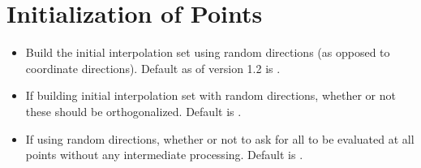 \documentclass[letterpaper,10pt,english]{sphinxmanual}
\begin{document}
\section{Initialization of Points}
\label{\detokenize{advanced:initialization-of-points}}\begin{itemize}
\item {} 
\sphinxAtStartPar
{} \sphinxhyphen{} Build the initial interpolation set using random directions (as opposed to coordinate directions). Default as of version 1.2 is .

\item {} 
\sphinxAtStartPar
{} \sphinxhyphen{} If building initial interpolation set with random directions, whether or not these should be orthogonalized. Default is .

\item {} 
\sphinxAtStartPar
{} \sphinxhyphen{} If using random directions, whether or not to ask for all  to be evaluated at all points without any intermediate processing. Default is .

\end{itemize}
\end{document}
